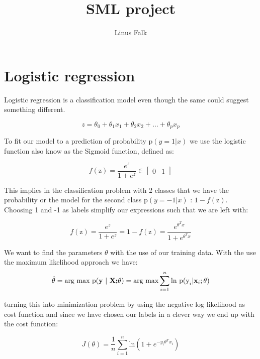 \documentclass[a4paper]{article}
\title{SML project}
\author{Linus Falk}
\begin{document}
\maketitle
\section{Logistic regression}

Logistic regression is a classification model even though the same could suggest something different. 

\begin{equation}
z = \theta_0 + \theta_1x_1 + \theta_2x_2 + \ldots + \theta_px_p
\end{equation}

To fit our model to a prediction of probability $\text{p}(y = 1 | x) $ we use the logistic function also know as the Sigmoid function, defined as: 

\begin{equation}
f(\text{z}) = \frac{e^{z}} {1 + e^{z}} \in \begin{bmatrix} 0& 1 \end{bmatrix} 
\end{equation}


This implies in the classification problem with 2 classes that we have the probability or the model for the second class $\text{p}(y = -1 | x)$ : $ 1 - f(\text{z})$. Choosing 1 and -1 as labels simplify our expressions such that we are left with:

\begin{equation}
f(\text{z}) = \frac{e^{z}} {1 + e^{z}} = 1 - f(\text{z}) = \frac{e^{\theta^{T}x}} {1+e^{\theta^{T}x}}
\end{equation}



We want to find the parameters $\theta$ with the use of our training data. With the use the maximum likelihood approach we have:
\begin{equation}
\hat{\theta} = \text{arg max p(\textbf{y} $|$ \textbf{X;$\theta$})} = \text{arg max} \sum_{i=1}^{n} \text{ln } \text{p(y}_i | \textbf{x}_i;\theta)
\end{equation}

turning this into minimization problem by using the negative log likelihood as cost function and since we have chosen our labels in a clever way we end up with the cost function:

\begin{equation}
J(\theta) = \frac{1} {n} \sum_{i=1}^{n} \text{ln}(1+e^{-y_i\theta^{T}x_i})
\end{equation}
\end{document}
